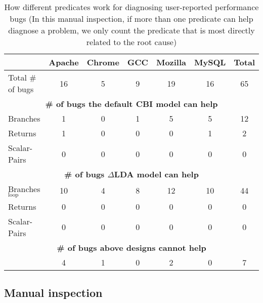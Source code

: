 \begin{table*}[tb!]
\begin{adjustwidth}{-.5in}{-.5in}
\scriptsize
\centering
{
\begin{tabular}{lcccccc}
\toprule
&Apache&Chrome&GCC&Mozilla&MySQL&Total\\
\midrule
Total \# of bugs  & 16 & 5 & 9 & 19 & 16 & 65 \\
\midrule
\multicolumn{7}{c}{\bf \# of bugs the default CBI model can help}\\
\multicolumn{1}{l}{{ Branches} }
&1&0&1&5&5&12\\
\multicolumn{1}{l}{{ Returns} }
&1&0&0&0&1&2\\
\multicolumn{1}{l}{{ Scalar-Pairs} }
 &0&0&0&0&0&0\\
\midrule
\multicolumn{7}{c}{\bf \# of bugs $\Delta$LDA model can help}\\
\multicolumn{1}{l}{{ Branches$_{\text{loop}}$} }
&10&4&8&12&10&44\\
\multicolumn{1}{l}{{ Returns} }
&0 &0&0& 0&0&0\\
\multicolumn{1}{l}{{ Scalar-Pairs} }
&0 &0&0&0 &0&0\\
\midrule
\multicolumn{7}{c}{\bf \# of bugs above designs cannot help}\\
\multicolumn{1}{l}{{ } }
&4&1&0&2&0&7 \\
\bottomrule
\end{tabular}
}
\end{adjustwidth}
\caption{How different predicates work for diagnosing user-reported performance bugs (In this manual inspection, if more than one 
predicate can help diagnose a problem, we only count the predicate
that is most directly related to the root cause)}
\label{tab:5_predicate}
\end{table*}

\subsection{Manual inspection}
\label{sec:5_manual_results}




